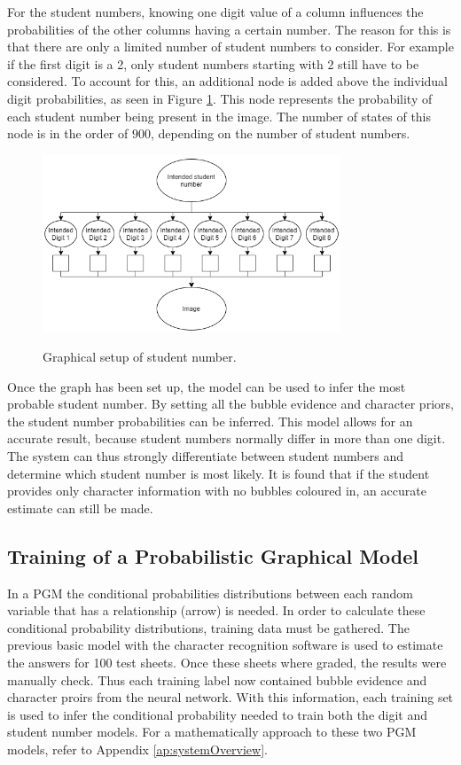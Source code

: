 For the student numbers, knowing one digit value of a column influences the probabilities of the other columns having a certain number. The reason for this is that there are only a limited number of student numbers to consider. For example if the first digit is a 2, only student numbers starting with 2 still have to be considered. To account for this, an additional node is added above the individual digit probabilities, as seen in Figure \ref{fig:stdNumCh4}. This node represents the probability of each student number being present in the image. The number of states of this node is in the order of $ 900$, depending on the number of student numbers.
\begin{figure}[b]
  \centering
  \includegraphics[width=8.9cm]{stdNum}\\
  \caption{Graphical setup of student number.}
  \label{fig:stdNumCh4}
\end{figure}
Once the graph has been set up, the model can be used to infer the most probable student number. By setting all the bubble evidence and character priors, the student number probabilities can be inferred. This model allows for an accurate result, because student numbers normally differ in more than one digit. The system can thus strongly differentiate between student numbers and determine which student number is most likely. It is found that if the student provides only character information with no bubbles coloured in, an accurate estimate can still be made.

\subsection{Training of a Probabilistic Graphical Model}
In a PGM the conditional probabilities distributions between each random variable that has a relationship (arrow) is needed. In order to calculate these conditional probability distributions, training data must be gathered. The previous basic model with the character recognition software is used to estimate the answers for 100 test sheets. Once these sheets where graded, the results were manually check. Thus each training label now contained bubble evidence and character proirs from the neural network. With this information, each training set is used to infer the conditional probability needed to train both the digit and student number models. For a mathematically approach to these two PGM models, refer to Appendix \ref{ap:systemOverview}.

